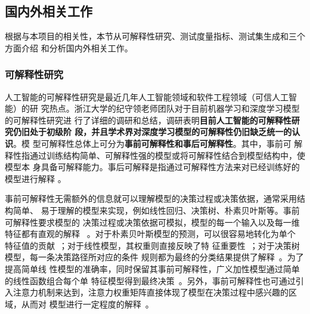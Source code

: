 \subsection{国内外相关工作}\label{relatedwork}


根据与本项目的相关性，本节从可解释性研究、测试度量指标、测试集生成和三个方面介绍
和分析国内外相关工作。

\subsubsection{可解释性研究}
{人工智能的可解释性研究是最近几年人工智能领域和软件工程领域（可信人工智能）的研
	究热点}。浙江大学的纪守领老师团队对于目前机器学习和深度学习模型的可解释性研究进
行了详细的调研和总结，调研表明\textbf{目前人工智能的可解释性研究仍旧处于初级阶
	段，并且学术界对深度学习模型的可解释性仍旧缺乏统一的认识}。模
型可解释性总体上可分为\textbf{事前可解释性和事后可解释性}。其中，事前可
解释性指通过训练结构简单、可解释性强的模型或将可解释性结合到模型结构中，使模型本
身具备可解释能力。事后可解释是指通过可解释性方法来对已经训练好的模型进行解释
。

事前可解释性无需额外的信息就可以理解模型的决策过程或决策依据，通常采用结构简单、
易于理解的模型来实现，例如线性回归、决策树、朴素贝叶斯等。事前可解释性要求模型的
决策过程或决策依据可模拟，模型的每一个输入以及每一维特征都有直观的解释
~。对于朴素贝叶斯模型的预测，可以很容易地转化为单个
特征值的贡献~；对于线性模型，其权重则直接反映了特
征重要性~；对于决策树模型，每一条决策路径所对应的条件
规则都为最终的分类结果提供了解释~。为了提高简单线
性模型的准确率，同时保留其事前可解释性，广义加性模型通过简单的线性函数组合每个单
特征模型得到最终决策~。另外，事前可解释性也可通过引
入注意力机制来达到，注意力权重矩阵直接体现了模型在决策过程中感兴趣的区域，从而对
模型进行一定程度的解释~。

